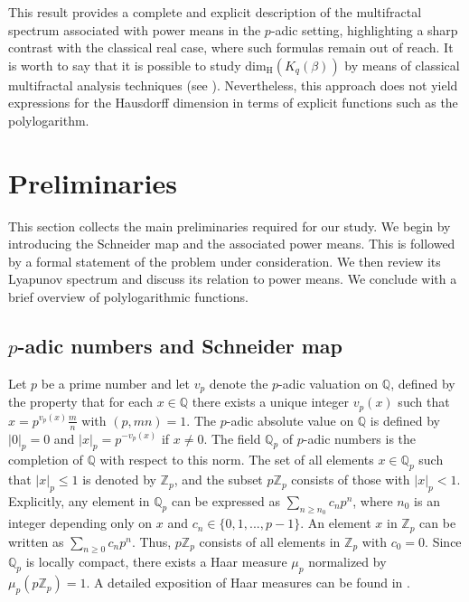 \documentclass[11pt]{amsart}
\theoremstyle{remark}
\numberwithin{equation}{section}
\newcommand{\Q}{\mathbb{Q}}
\newcommand{\Z}{\mathbb{Z}}
\newcommand{\Zp}{\mathbb{Z}_p}
\newcommand{\dimH}{\mathrm{dim}_{\mathrm{H}}}
\begin{document}
This result provides a complete and explicit description of the multifractal spectrum associated with power means in the $p$-adic setting, highlighting a sharp contrast with the classical real case, where such formulas remain out of reach. It is worth to say that it is possible to study $\dimH\left(K_{q}(\beta)\right)$ by means of classical multifractal analysis techniques (see \cite{jaerisch2011regularity,yh}). Nevertheless, this approach does not yield expressions for the Hausdorff dimension in terms of explicit functions such as the polylogarithm.



\section{Preliminaries}

This section collects the main preliminaries required for our study. We begin by introducing the Schneider map and the associated power means. This is followed by a formal statement of the problem under consideration. We then review its Lyapunov spectrum and discuss its relation to power means. We conclude with a brief overview of polylogarithmic functions.



\subsection{$p$-adic numbers and Schneider map}\label{padic numbers and schneider maps}

Let $p$ be a prime number and let $v_p$ denote the $p$-adic valuation on $\Q$, defined by the property that for each $x\in \Q$ there exists a unique integer
$v_p(x)$ such that $x=p^{v_p(x)}\frac{m}{n}$ with $(p,mn)=1$. The $p$-adic absolute value on $\Q$ is defined by $|0|_p=0$ and $|x|_p=p^{-v_p(x)}$ if $x\neq 0$. The field $\Q_p$ of $p$-adic numbers is the completion of $\Q$ with respect to this norm. The set of all elements $x\in \Q_p$ such that $|x|_p\leq 1$ is denoted by $\Z_p$, and the subset $p\Z_p$ consists of those with $|x|_p<1$. Explicitly, any element in $\Q_p$ can be expressed as $\sum_{n\geq n_0}c_np^{n}$, where $n_0$ is an integer depending only on $x$ and $c_n\in \{0,1,...,p-1\}$. An element $x$ in $\Z_p$ can be written as $\sum_{n\geq0} c_np^n$. Thus, $p\Zp$ consists of all elements in $\Z_p$ with $c_0=0.$ 
Since $\Q_p$ is locally compact, there exists a Haar measure $\mu_p$ normalized by $\mu_{p}(p\Z_p)=1$. A detailed exposition of Haar measures can be found in \cite{folland}.
\end{document}
